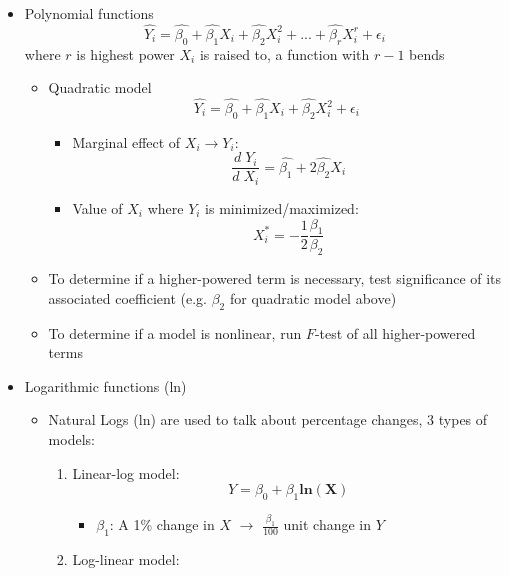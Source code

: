 \documentclass{article}
\begin{document}
\begin{itemize}
	\item Polynomial functions
	\begin{equation*}
	\hat{Y_i} = \hat{\beta_0} + \hat{\beta_1} X_i + \hat{\beta_2} X_i^2 + ... + \hat{\beta_{r}} X_i^{r} + \epsilon_i
	\end{equation*}
	where $r$ is highest power $X_i$ is raised to, a function with $r-1$ bends
	\begin{itemize}
		\item Quadratic model  
	\begin{equation*}
	\hat{Y_i} = \hat{\beta_0} + \hat{\beta_1} X_i + \hat{\beta_2} X_i^2 + \epsilon_i
	\end{equation*}
	\begin{itemize}
		\item Marginal effect of $X_i \rightarrow Y_i$:
		\begin{equation*}
			\frac{d \; Y_i}{d \; X_i}=\hat{\beta_1}+2\hat{\beta_2}X_i
		\end{equation*}
		\item Value of $X_i$ where $Y_i$ is minimized/maximized: 
		\begin{equation*}
			X_i^*=-\frac{1}{2}\frac{\beta_1}{\beta_2}
		\end{equation*}
	\end{itemize}
	\item To determine if a higher-powered term is necessary, test significance of its associated coefficient (e.g. $\beta_2$ for quadratic model above)
	\item To determine if a model is nonlinear, run $F$-test of all higher-powered terms 
	\end{itemize}	
	\item Logarithmic functions (ln)
	\begin{itemize}
		\item Natural Logs (ln) are used to talk about percentage changes, 3 types of models: 
		\begin{enumerate}
			\item Linear-log model: 
			\begin{equation*}
			Y=\beta_0+\beta_1 \mathbf{ln(X)}	
			\end{equation*}
			\begin{itemize}
				\item $\beta_1$: A 1\% change in $X$ $\rightarrow$ $\frac{\beta_1}{100}$ unit change in $Y$
			\end{itemize}
			\item Log-linear model:

\end{enumerate}
\end{itemize}
\end{itemize}
\end{document}
